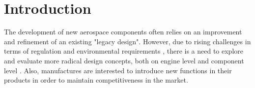 \documentclass[preprints,article,accept,moreauthors,pdftex]{Definitions/mdpi}
\begin{document}


\section{Introduction}
The development of new aerospace components often relies on an improvement and refinement of an existing "legacy design".
However, due to rising challenges in terms of regulation and environmental requirements \cite{ACARE2017StrategicAgenda}, there is a need to explore and evaluate more radical design concepts, both on engine level \cite{Filipenko2020ComparativeSystems, Parker2010GreenEnvironment} and component level \cite{Sjunnesson2019}. 
Also, manufactures are interested to introduce new functions in their products in order to maintain competitiveness in the market. 
\end{document}
